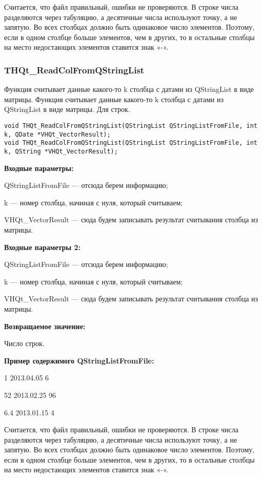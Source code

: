 \documentclass[a4paper,12pt]{article}
\begin{document}
Считается, что файл правильный, ошибки не проверяются. В строке числа разделяются через табуляцию, а десятичные числа используют точку, а не запятую. Во всех столбцах должно быть одинаковое число элементов. Поэтому, если в одном столбце больше элементов, чем в других, то в остальные столбцы на место недостающих элементов ставится знак «-».


\subsubsection{THQt\_ReadColFromQStringList}\label{THQt_ReadColFromQStringList}

Функция считывает данные какого-то k столбца с датами из QStringList в виде матрицы. Функция считывает данные какого-то k столбца с датами из QStringList в виде матрицы. Для строк.


\begin{lstlisting}[label=code_syntax_THQt_ReadColFromQStringList,caption=Синтаксис]
void THQt_ReadColFromQStringList(QStringList QStringListFromFile, int k, QDate *VHQt_VectorResult);
void THQt_ReadColFromQStringList(QStringList QStringListFromFile, int k, QString *VHQt_VectorResult);
\end{lstlisting}

\textbf{Входные параметры:}

QStringListFromFile --- отсюда берем информацию;
 
    k --- номер столбца, начиная с нуля, который считываем;
 
    VHQt\_VectorResult --- сюда будем записывать результат считывания столбца из матрицы.
	
\textbf{Входные параметры 2:}
	
	 QStringListFromFile --- отсюда берем информацию;
 
    k --- номер столбца, начиная с нуля, который считываем;
 
    VHQt\_VectorResult --- сюда будем записывать результат считывания столбца из матрицы.

\textbf{Возвращаемое значение:}

Число строк.

\textbf{Пример содержимого QStringListFromFile:}

1	2013.04.05	6

52	2013.02.25	96

6.4	2013.01.15	4

Считается, что файл правильный, ошибки не проверяются. В строке числа разделяются через табуляцию, а десятичные числа используют точку, а не запятую. Во всех столбцах должно быть одинаковое число элементов. Поэтому, если в одном столбце больше элементов, чем в других, то в остальные столбцы на место недостающих элементов ставится знак «-».
\end{document}
